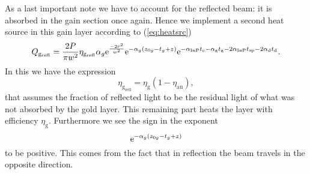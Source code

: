 As a last important note we have to account
for the reflected beam:
it is absorbed in the gain section once again.
Hence we implement a second heat source in this gain layer
according to (\ref{eq:heatsrc})
\begin{equation}
Q_{\mathrm{g}_\mathrm{refl}} = \frac{2P}{\pi w^2} \eta_{\mathrm{g}_\mathrm{refl}}\alpha_g \mathrm{e}^\frac{-2r^2}{w^2} \mathrm{e}^{-\alpha_g(z_{0g}-t_g+z)}
 \mathrm{e}^{-\alpha_\mathrm{InP} t_c -\alpha_\mathrm{g} t_\mathrm{g} -2\alpha_\mathrm{InP}t_\mathrm{sp} -2\alpha_\mathrm{d}t_\mathrm{d}}.
\label{eq:heatsrcrefl}
\end{equation}
In this we have the expression
\begin{equation}
\eta_{\mathrm{g}_\mathrm{refl}} = \eta_\mathrm{g} (1-\eta_\mathrm{au}),
\label{eq:etagrefl}
\end{equation}
that assumes the fraction of reflected light
to be the residual light of what was not absorbed by the gold layer.
This remaining part heats the layer with efficiency $\eta_\mathrm{g}$.
Furthermore we see the sign in the exponent
\begin{equation*}
\mathrm{e}^{-\alpha_g(z_{0g}-t_g+z)}
\end{equation*}
to be positive.
This comes from the fact that in reflection
the beam travels in the opposite direction.
